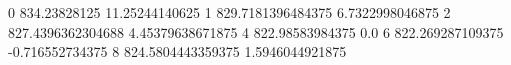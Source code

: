0 834.23828125 11.25244140625
1 829.7181396484375 6.7322998046875
2 827.4396362304688 4.45379638671875
4 822.98583984375 0.0
6 822.269287109375 -0.716552734375
8 824.5804443359375 1.5946044921875

